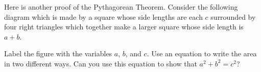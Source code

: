 \documentclass[nooutcomes,noauthor]{ximera}
\begin{document}
\begin{problem}
Here is another proof of the Pythagorean Theorem. Consider the following diagram which is made by a square whose side lengths are each $c$ surrounded by four right triangles which together make a larger square whose side length is $a+b$.
\begin{image} \end{image}

Label the figure with the variables $a$, $b$, and $c$. Use an equation to write the area in two different ways. Can you use this equation to show that $a^2 + b^2 = c^2$?
\end{problem}

\newpage
\end{document}

